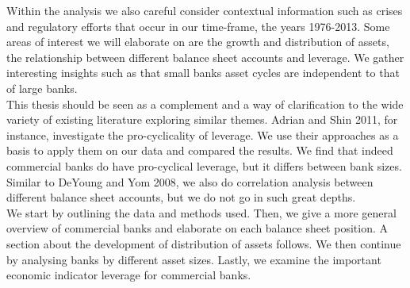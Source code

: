 \documentclass[12pt, a4paper]{article} %
\begin{document}
Within the analysis we also careful consider contextual information such as crises and regulatory efforts that occur in our time-frame, the years 1976-2013. Some areas of interest we will elaborate on are the growth and distribution of assets, the relationship between different balance sheet accounts and leverage. We gather interesting insights such as that small banks asset cycles are independent to that of large banks.\\
This thesis should be seen as a complement and a way of clarification to the wide variety of existing literature exploring similar themes. Adrian and Shin 2011, for instance, investigate the pro-cyclicality of leverage. We use their approaches as a basis to apply them on our data and compared the results. We find that indeed commercial banks do have pro-cyclical leverage, but it differs between bank sizes. Similar to DeYoung and Yom 2008, we also do correlation analysis between different balance sheet accounts, but we do not go in such great depths.\\
We start by outlining the data and methods used. Then, we give a more general overview of commercial banks and elaborate on each balance sheet position. A section about the development of distribution of assets follows. We then continue by analysing banks by different asset sizes. Lastly, we examine the important economic indicator leverage for commercial banks.
\end{document}
